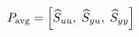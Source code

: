 \documentclass[preview]{standalone}
\begin{document}
\begin{align*}
\special{dvisvgm:raw <g id='unique000'>}P_{\mathrm{avg}}=\left[\widehat{S}_{uu},\;\widehat{S}_{yu},\;\widehat{S}_{yy}\right]\special{dvisvgm:raw </g>}
\end{align*}
\end{document}
